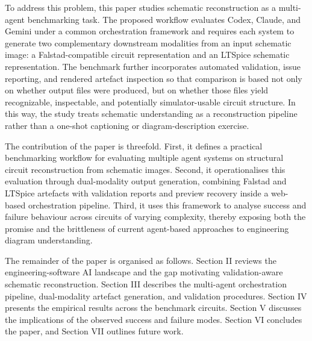 To address this problem, this paper studies schematic reconstruction as a multi-agent benchmarking task. The proposed workflow evaluates Codex, Claude, and Gemini under a common orchestration framework and requires each system to generate two complementary downstream modalities from an input schematic image: a Falstad-compatible circuit representation and an LTSpice schematic representation. The benchmark further incorporates automated validation, issue reporting, and rendered artefact inspection so that comparison is based not only on whether output files were produced, but on whether those files yield recognizable, inspectable, and potentially simulator-usable circuit structure. In this way, the study treats schematic understanding as a reconstruction pipeline rather than a one-shot captioning or diagram-description exercise.

The contribution of the paper is threefold. First, it defines a practical benchmarking workflow for evaluating multiple agent systems on structural circuit reconstruction from schematic images. Second, it operationalises this evaluation through dual-modality output generation, combining Falstad and LTSpice artefacts with validation reports and preview recovery inside a web-based orchestration pipeline. Third, it uses this framework to analyse success and failure behaviour across circuits of varying complexity, thereby exposing both the promise and the brittleness of current agent-based approaches to engineering diagram understanding.

The remainder of the paper is organised as follows. Section II reviews the engineering-software AI landscape and the gap motivating validation-aware schematic reconstruction. Section III describes the multi-agent orchestration pipeline, dual-modality artefact generation, and validation procedures. Section IV presents the empirical results across the benchmark circuits. Section V discusses the implications of the observed success and failure modes. Section VI concludes the paper, and Section VII outlines future work.
